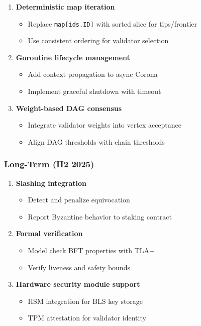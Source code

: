 \documentclass[
]{article}
\providecommand{\tightlist}{%
  \setlength{\itemsep}{0pt}\setlength{\parskip}{0pt}}
\begin{document}
\begin{enumerate}
\def\labelenumi{\arabic{enumi}.}
\setcounter{enumi}{3}
\item
  \textbf{Deterministic map iteration}

  \begin{itemize}
  \tightlist
  \item
    Replace \texttt{map{[}ids.ID{]}} with sorted slice for tips/frontier
  \item
    Use consistent ordering for validator selection
  \end{itemize}
\item
  \textbf{Goroutine lifecycle management}

  \begin{itemize}
  \tightlist
  \item
    Add context propagation to async Corona
  \item
    Implement graceful shutdown with timeout
  \end{itemize}
\item
  \textbf{Weight-based DAG consensus}

  \begin{itemize}
  \tightlist
  \item
    Integrate validator weights into vertex acceptance
  \item
    Align DAG thresholds with chain thresholds
  \end{itemize}
\end{enumerate}

\subsubsection{Long-Term (H2 2025)}\label{long-term-h2-2025}

\begin{enumerate}
\def\labelenumi{\arabic{enumi}.}
\setcounter{enumi}{6}
\item
  \textbf{Slashing integration}

  \begin{itemize}
  \tightlist
  \item
    Detect and penalize equivocation
  \item
    Report Byzantine behavior to staking contract
  \end{itemize}
\item
  \textbf{Formal verification}

  \begin{itemize}
  \tightlist
  \item
    Model check BFT properties with TLA+
  \item
    Verify liveness and safety bounds
  \end{itemize}
\item
  \textbf{Hardware security module support}

  \begin{itemize}
  \tightlist
  \item
    HSM integration for BLS key storage
  \item
    TPM attestation for validator identity
  \end{itemize}
\end{enumerate}
\end{document}
